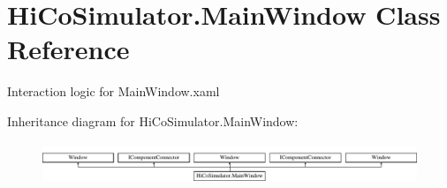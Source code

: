 \hypertarget{class_hi_co_simulator_1_1_main_window}{}\section{Hi\+Co\+Simulator.\+Main\+Window Class Reference}
\label{class_hi_co_simulator_1_1_main_window}


Interaction logic for Main\+Window.\+xaml  


Inheritance diagram for Hi\+Co\+Simulator.\+Main\+Window\+:\begin{figure}[H]
\begin{center}
\leavevmode
\includegraphics[height=1.272727cm]{class_hi_co_simulator_1_1_main_window}
\end{center}
\end{figure}
